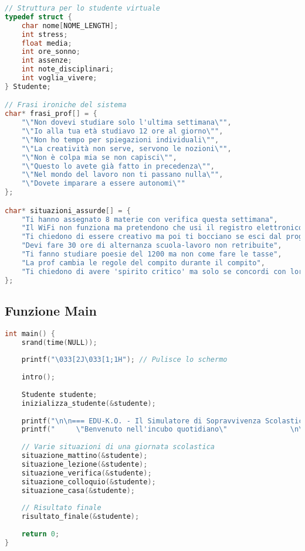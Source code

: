 \documentclass[a4paper,12pt]{article}
\begin{document}
\begin{lstlisting}[language=C, caption=Strutture dati e array]
// Struttura per lo studente virtuale
typedef struct {
    char nome[NOME_LENGTH];
    int stress;
    float media;
    int ore_sonno;
    int assenze;
    int note_disciplinari;
    int voglia_vivere;
} Studente;

// Frasi ironiche del sistema
char* frasi_prof[] = {
    "\"Non dovevi studiare solo l'ultima settimana\"",
    "\"Io alla tua età studiavo 12 ore al giorno\"",
    "\"Non ho tempo per spiegazioni individuali\"",
    "\"La creatività non serve, servono le nozioni\"",
    "\"Non è colpa mia se non capisci\"",
    "\"Questo lo avete già fatto in precedenza\"",
    "\"Nel mondo del lavoro non ti passano nulla\"",
    "\"Dovete imparare a essere autonomi\""
};

char* situazioni_assurde[] = {
    "Ti hanno assegnato 8 materie con verifica questa settimana",
    "Il WiFi non funziona ma pretendono che usi il registro elettronico",
    "Ti chiedono di essere creativo ma poi ti bocciano se esci dal programma",
    "Devi fare 30 ore di alternanza scuola-lavoro non retribuite",
    "Ti fanno studiare poesie del 1200 ma non come fare le tasse",
    "La prof cambia le regole del compito durante il compito",
    "Ti chiedono di avere 'spirito critico' ma solo se concordi con loro"
};
\end{lstlisting}

\subsection{Funzione Main}

\begin{lstlisting}[language=C, caption=Funzione main]
int main() {
    srand(time(NULL));
    
    printf("\033[2J\033[1;1H"); // Pulisce lo schermo
    
    intro();
    
    Studente studente;
    inizializza_studente(&studente);
    
    printf("\n\n=== EDU-K.O. - Il Simulatore di Sopravvivenza Scolastica ===\n");
    printf("     \"Benvenuto nell'incubo quotidiano\"               \n\n");
    
    // Varie situazioni di una giornata scolastica
    situazione_mattino(&studente);
    situazione_lezione(&studente);
    situazione_verifica(&studente);
    situazione_colloquio(&studente);
    situazione_casa(&studente);
    
    // Risultato finale
    risultato_finale(&studente);
    
    return 0;
}
\end{lstlisting}
\end{document}
